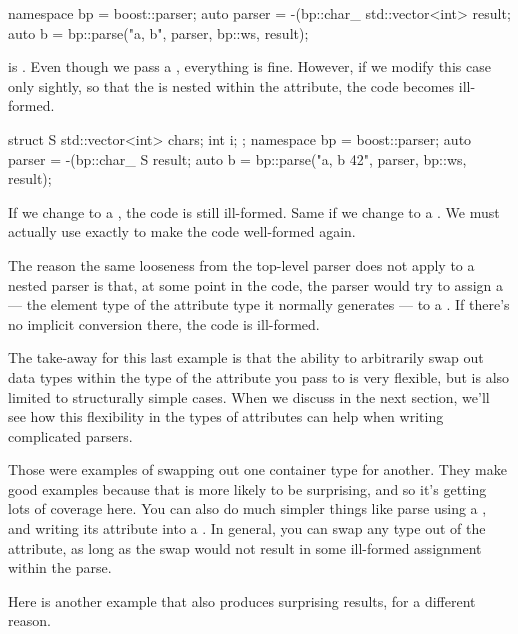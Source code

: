 \documentclass{MyBook}
\begin{document}
\begin{code}
namespace bp = boost::parser;
auto parser = -(bp::char_ %
std::vector<int> result;
auto b = bp::parse("a, b", parser, bp::ws, result);
\end{code}

\emph{} is . Even though we pass a , everything is fine. However, if we modify this case only sightly, so that the  is nested within the attribute, the code becomes ill-formed.

\begin{code}
struct S
{
    std::vector<int> chars;
    int i;
};
namespace bp = boost::parser;
auto parser = -(bp::char_ %
S result;
auto b = bp::parse("a, b 42", parser, bp::ws, result);
\end{code}

If we change  to a , the code is still ill-formed. Same if we change  to a . We must actually use  exactly to make the code well-formed again.

The reason the same looseness from the top-level parser does not apply to a nested parser is that, at some point in the code, the parser  would try to assign a  --- the element type of the attribute type it normally generates --- to a . If there's no implicit conversion there, the code is ill-formed.

The take-away for this last example is that the ability to arbitrarily swap out data types within the type of the attribute you pass to  is very flexible, but is also limited to structurally simple cases. When we discuss  in the next section, we'll see how this flexibility in the types of attributes can help when writing complicated parsers.

Those were examples of swapping out one container type for another. They make good examples because that is more likely to be surprising, and so it's getting lots of coverage here. You can also do much simpler things like parse using a , and writing its attribute into a . In general, you can swap any type  out of the attribute, as long as the swap would not result in some ill-formed assignment within the parse.

Here is another example that also produces surprising results, for a different reason.
\end{document}
